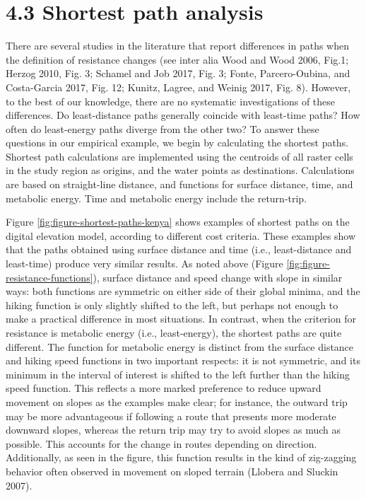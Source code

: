 \documentclass[]{elsarticle} %
\begin{document}
\hypertarget{shortest-path-analysis}{%
\section{4.3 Shortest path analysis}\label{shortest-path-analysis}}

There are several studies in the literature that report differences in
paths when the definition of resistance changes (see inter alia Wood and
Wood 2006, Fig.1; Herzog 2010, Fig. 3; Schamel and Job 2017, Fig. 3;
Fonte, Parcero-Oubina, and Costa-Garcia 2017, Fig. 12; Kunitz, Lagree,
and Weinig 2017, Fig. 8). However, to the best of our knowledge, there
are no systematic investigations of these differences. Do least-distance
paths generally coincide with least-time paths? How often do
least-energy paths diverge from the other two? To answer these questions
in our empirical example, we begin by calculating the shortest paths.
Shortest path calculations are implemented using the centroids of all
raster cells in the study region as origins, and the water points as
destinations. Calculations are based on straight-line distance, and
functions for surface distance, time, and metabolic energy. Time and
metabolic energy include the return-trip.

Figure \ref{fig:figure-shortest-paths-kenya} shows examples of shortest
paths on the digital elevation model, according to different cost
criteria. These examples show that the paths obtained using surface
distance and time (i.e., least-distance and least-time) produce very
similar results. As noted above (Figure
\ref{fig:figure-resistance-functions}), surface distance and speed
change with slope in similar ways: both functions are symmetric on
either side of their global minima, and the hiking function is only
slightly shifted to the left, but perhaps not enough to make a practical
difference in most situations. In contrast, when the criterion for
resistance is metabolic energy (i.e., least-energy), the shortest paths
are quite different. The function for metabolic energy is distinct from
the surface distance and hiking speed functions in two important
respects: it is not symmetric, and its minimum in the interval of
interest is shifted to the left further than the hiking speed function.
This reflects a more marked preference to reduce upward movement on
slopes as the examples make clear; for instance, the outward trip may be
more advantageous if following a route that presents more moderate
downward slopes, whereas the return trip may try to avoid slopes as much
as possible. This accounts for the change in routes depending on
direction. Additionally, as seen in the figure, this function results in
the kind of zig-zagging behavior often observed in movement on sloped
terrain (Llobera and Sluckin 2007).
\end{document}
